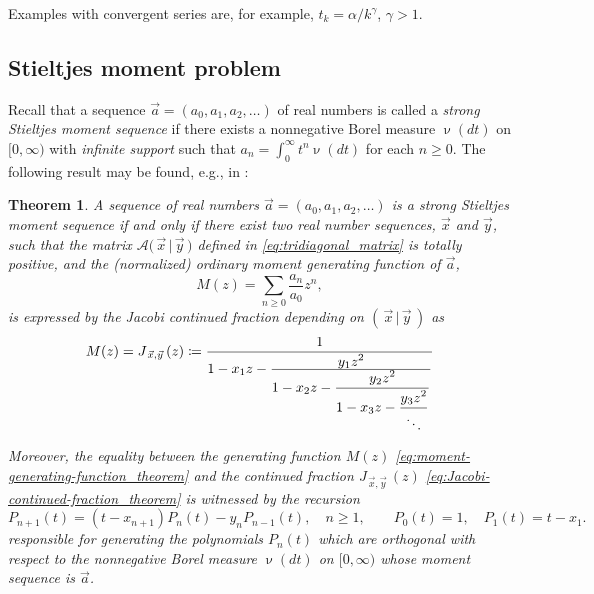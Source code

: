 \documentclass[letterpaper,11pt,oneside,reqno]{article}
\numberwithin{equation}{section}
\newtheorem{theorem}[proposition]{Theorem}
\theoremstyle{definition}
\begin{document}
Examples with convergent series are, for example, $t_k=\alpha/k^\gamma$, $\gamma>1$.

\subsection{Stieltjes moment problem}


Recall that a sequence
$\vec{a}=(a_0, a_1, a_2, \dots)$ of real numbers is called a
\emph{strong Stieltjes moment
sequence} if there exists a nonnegative Borel measure $\upnu(dt)$ on $[0,\infty)$
with \emph{infinite support} such that
$a_n = \int_0^\infty t^n  \upnu(dt)$ for each $n \geq 0$.
The following result may be found, e.g.,
in
\cite{sokal2020euler}:

\begin{theorem}
\label{thm:stieltjes-moments-theorem}
A sequence of real numbers $\vec{a} = (a_0, a_1, a_2, \dots)$ is a strong Stieltjes moment sequence if and only if there exist two real number sequences, $\vec{x}$ and $\vec{y}$, such that the matrix $\mathcal{A} \big( \, \vec{x} \, | \, \vec{y} \, \big)$ defined in \eqref{eq:tridiagonal_matrix} is totally positive, and the (normalized) ordinary moment generating function of $\vec a$,
\begin{equation}
	\label{eq:moment-generating-function_theorem}
	M(z) = \sum_{n \geq 0} \frac{a_n}{a_0} z^n,
\end{equation}
is expressed by the Jacobi continued fraction
depending on $( \, \vec{x} \, | \, \vec{y} \, )$ as
\begin{equation}
	\label{eq:Jacobi-continued-fraction_theorem}
	M(z)=
	J_{\, \vec{x}, \vec{y}} \,(z) \coloneqq
{1 \over {1 - x_1z - {\displaystyle y_1z^2 \over {\displaystyle 1 - x_2 z - {\displaystyle y_2z^2 \over
{\displaystyle 1 - x_3 z - {\displaystyle y_3z^2 \over {\ddots } } } } } } } }
\end{equation}

Moreover,
the equality between the
generating function $M(z)$ \eqref{eq:moment-generating-function_theorem}
and the continued fraction
$J_{\, \vec{x}, \vec{y}} \,(z)$ \eqref{eq:Jacobi-continued-fraction_theorem}
is witnessed by the recursion
\begin{equation*}
	P_{n+1}(t) = (t - x_{n+1})P_n(t) - y_n P_{n-1}(t),
	\quad n \geq 1,
	\qquad
	P_0(t) = 1, \quad P_1(t) = t - x_1.
\end{equation*}
responsible for generating the polynomials
$P_n(t)$ which are orthogonal with respect to the nonnegative
Borel measure $\upnu(dt)$
on $[0,\infty)$ whose moment sequence is
$\vec{a}$.
\end{theorem}
\end{document}

